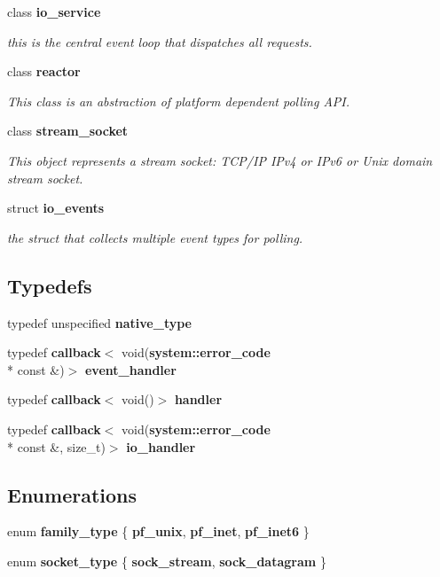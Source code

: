 \begin{DoxyCompactItemize}
class {\bf io\-\_\-service}
\begin{DoxyCompactList}\small\item\em this is the central event loop that dispatches all requests. \end{DoxyCompactList}\item 
class {\bf reactor}
\begin{DoxyCompactList}\small\item\em This class is an abstraction of platform dependent polling A\-P\-I. \end{DoxyCompactList}\item 
class {\bf stream\-\_\-socket}
\begin{DoxyCompactList}\small\item\em This object represents a stream socket\-: T\-C\-P/\-I\-P I\-Pv4 or I\-Pv6 or Unix domain stream socket. \end{DoxyCompactList}\item 
struct {\bf io\-\_\-events}
\begin{DoxyCompactList}\small\item\em the struct that collects multiple event types for polling. \end{DoxyCompactList}\end{DoxyCompactItemize}
\subsection*{Typedefs}
\begin{DoxyCompactItemize}
\item 
typedef unspecified {\bf native\-\_\-type}
\item 
typedef {\bf callback}$<$ void({\bf system\-::error\-\_\-code} \\*
const \&)$>$ {\bf event\-\_\-handler}
\item 
typedef {\bf callback}$<$ void()$>$ {\bf handler}
\item 
typedef {\bf callback}$<$ void({\bf system\-::error\-\_\-code} \\*
const \&, size\-\_\-t)$>$ {\bf io\-\_\-handler}
\end{DoxyCompactItemize}
\subsection*{Enumerations}
\begin{DoxyCompactItemize}
\item 
enum {\bf family\-\_\-type} \{ {\bfseries pf\-\_\-unix}, 
{\bfseries pf\-\_\-inet}, 
{\bfseries pf\-\_\-inet6}
 \}
\item 
enum {\bf socket\-\_\-type} \{ {\bfseries sock\-\_\-stream}, 
{\bfseries sock\-\_\-datagram}
 \}
\end{DoxyCompactItemize}
